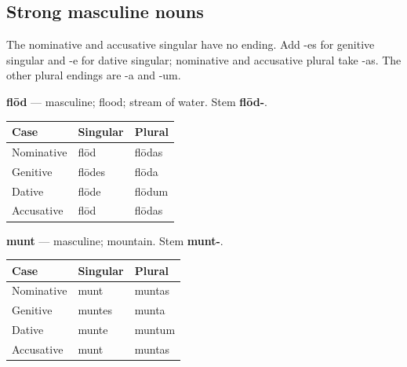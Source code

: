 \subsection*{Strong masculine nouns}

The nominative and accusative singular have no ending. Add -es for genitive singular and -e for dative singular; nominative and accusative plural take -as. The other plural endings are -a and -um.

\textbf{flōd} — masculine; flood; stream of water. Stem \textbf{flōd-}.

\par\begingroup
\fontsize{10.5}{13.2}\selectfont
\setlength{\LTleft}{0pt}\setlength{\LTright}{\fill}
\noindent
\begin{tabular}{@{}>{\raggedright\arraybackslash}p{39.46mm}>{\raggedright\arraybackslash}p{39.46mm}>{\raggedright\arraybackslash}p{39.46mm}@{}}
\toprule
\textbf{Case} & \textbf{Singular} & \textbf{Plural} \\
\midrule
Nominative & flōd & flōdas \\
Genitive & flōdes & flōda \\
Dative & flōde & flōdum \\
Accusative & flōd & flōdas \\
\bottomrule
\end{tabular}
\par\endgroup

\textbf{munt} — masculine; mountain. Stem \textbf{munt-}.

\par\begingroup
\fontsize{10.5}{13.2}\selectfont
\setlength{\LTleft}{0pt}\setlength{\LTright}{\fill}
\noindent
\begin{tabular}{@{}>{\raggedright\arraybackslash}p{39.46mm}>{\raggedright\arraybackslash}p{39.46mm}>{\raggedright\arraybackslash}p{39.46mm}@{}}
\toprule
\textbf{Case} & \textbf{Singular} & \textbf{Plural} \\
\midrule
Nominative & munt & muntas \\
Genitive & muntes & munta \\
Dative & munte & muntum \\
Accusative & munt & muntas \\
\bottomrule
\end{tabular}
\par\endgroup

